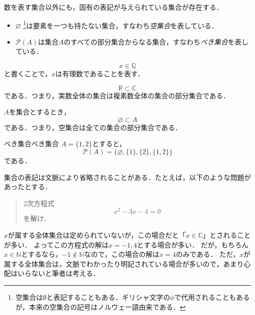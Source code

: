 \begin{shadebox}
  数を表す集合以外にも，固有の表記が与えられている集合が存在する．
  \begin{itemize}
    \item $\varnothing$ \footnote{空集合は$\emptyset$と表記することもある．ギリシャ文字の$\phi$で代用されることもあるが，本来の空集合の記号はノルウェー語由来である．}は要素を一つも持たない集合，すなわち\emph{空集合}を表している．
    \item $\mathcal{P}(A)$は集合$A$のすべての部分集合からなる集合，すなわち\emph{べき集合}を表している．
  \end{itemize}
\end{shadebox}



\begin{example}{}{}
  \[
    x \in \mathbb{Q}
  \]
  と書くことで，$x$は有理数であることを表す．
\end{example}

\begin{example}{}{}
  \[
    \mathbb{R} \subset \mathbb{C}
  \]
  である．つまり，実数全体の集合は複素数全体の集合の部分集合である．
\end{example}

\begin{example}{}{}
  $A$を集合とするとき，
  \[
    \varnothing  \subset A
  \]
  である．つまり，空集合は全ての集合の部分集合である．
\end{example}

\begin{example}{べき集合}{べき集合}
  $A=\{ 1, 2\}$とすると，
  \[
    \mathcal{P}(A) = \{ \varnothing, \{1\}, \{2\}, \{1, 2\}\}
  \]
  である．
\end{example}



集合の表記は文脈により省略されることがある．たとえば，以下のような問題があったとする．
\begin{quotation}
  2次方程式
  \[
    x^2 - 3x -4 =0
  \]
  を解け．
\end{quotation}
$x$が属する全体集合は定められていないが，この場合だと「$x \in \mathbb{C}$」とされることが多い．
よってこの方程式の解は$x = -1 , 4$とする場合が多い．
だが，もちろん$ x \in \mathbb{N}$とするなら，$ -1 \notin \mathbb{N}$なので，この場合の解は$ x= 4$のみである．
ただ，$x$が属する全体集合は，文脈でわかったり明記されている場合が多いので，あまり心配はいらないと筆者は考える．


